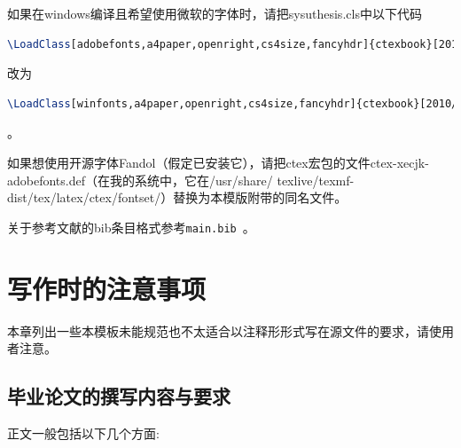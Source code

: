 ﻿\documentclass{sysuthesis}
\begin{document}
如果在windows编译且希望使用微软的字体时，请把{\ttfamily sysuthesis.cls}中以下代码
\begin{lstlisting}[language=TeX, keywordstyle=\color{blue}\bfseries, basicstyle=\ttfamily, breaklines=true, frame=shadowbox]
\LoadClass[adobefonts,a4paper,openright,cs4size,fancyhdr]{ctexbook}[2010/01/22]
\end{lstlisting}
改为
\begin{lstlisting}[language=TeX, keywordstyle=\color{blue}\bfseries, basicstyle=\ttfamily, breaklines=true, frame=shadowbox]
\LoadClass[winfonts,a4paper,openright,cs4size,fancyhdr]{ctexbook}[2010/01/22]
\end{lstlisting}。

如果想使用开源字体{\ttfamily Fandol}（假定已安装它），请把{\ttfamily ctex}宏包的文件{\ttfamily ctex-xecjk-adobefonts.def}（在我的系统中，它在{\ttfamily /usr/share/ texlive/texmf-dist/tex/latex/ctex/fontset/}）替换为本模版附带的同名文件。

关于参考文献的bib条目格式参考\texttt{main.bib}~\cite{article}\cite{book}\cite{phdthesis}\cite{inproc}\cite{masterthesis}\cite{manual}\cite{report}\cite{database}\cite{software}\cite{standard}\cite{newspaper}\cite{patent}。

\chapter{写作时的注意事项}

本章列出一些本模板未能规范也不太适合以注释形形式写在源文件的要求，请使用者注意。

\section{毕业论文的撰写内容与要求}

正文一般包括以下几个方面:
\end{document}
